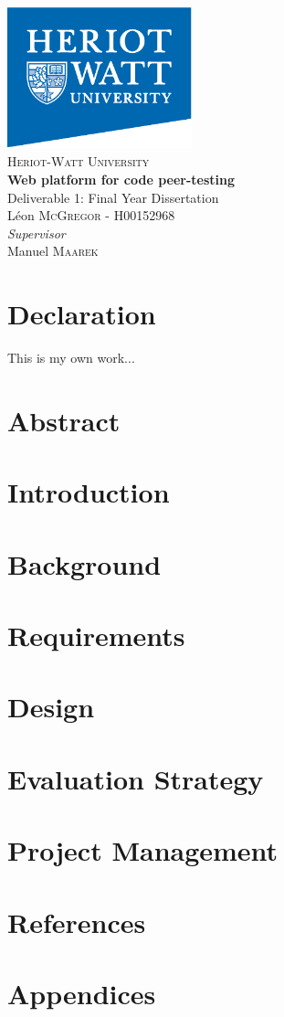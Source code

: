 \documentclass[a4paper,10pt]{article}
\newcommand{\titles}{\\\vspace{1cm}}
\begin{document}
{\centering\Large
\includegraphics[width=0.4\textwidth]{hwlogo}\titles
{\scshape\LARGE Heriot-Watt University\titles}
{\huge\bfseries Web platform for code peer-testing\titles}
Deliverable 1: Final Year Dissertation\titles
L\'eon \textsc{McGregor} - H00152968\titles
{\large\textit{Supervisor}\\}
Manuel \textsc{Maarek}\\
\vfill
}

\pagebreak

\tableofcontents

\pagestyle{headings}

\pagebreak

\section*{Declaration}
This is my own work...

\section{Abstract}

\section{Introduction}

\section{Background}

\section{Requirements}

\section{Design}

\section{Evaluation Strategy}

\section{Project Management}

\section*{References}

\section*{Appendices}
\end{document}
